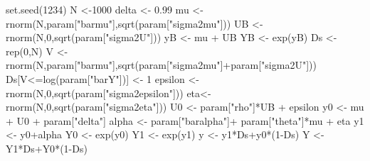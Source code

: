 \documentclass[
]{book}
\newenvironment{Shaded}{\begin{snugshade}}{\end{snugshade}}
\newcommand{\DecValTok}[1]{\textcolor[rgb]{0.00,0.00,0.81}{#1}}
\newcommand{\FloatTok}[1]{\textcolor[rgb]{0.00,0.00,0.81}{#1}}
\newcommand{\FunctionTok}[1]{\textcolor[rgb]{0.00,0.00,0.00}{#1}}
\newcommand{\NormalTok}[1]{#1}
\newcommand{\OtherTok}[1]{\textcolor[rgb]{0.56,0.35,0.01}{#1}}
\newcommand{\SpecialCharTok}[1]{\textcolor[rgb]{0.00,0.00,0.00}{#1}}
\newcommand{\StringTok}[1]{\textcolor[rgb]{0.31,0.60,0.02}{#1}}
\theoremstyle{definition}
\theoremstyle{definition}
\theoremstyle{definition}
\theoremstyle{definition}
\theoremstyle{remark}
\begin{document}
\begin{Shaded}
\begin{Highlighting}[]
\FunctionTok{set.seed}\NormalTok{(}\DecValTok{1234}\NormalTok{)}
\NormalTok{N }\OtherTok{\textless{}{-}}\DecValTok{1000}
\NormalTok{delta }\OtherTok{\textless{}{-}} \FloatTok{0.99}
\NormalTok{mu }\OtherTok{\textless{}{-}} \FunctionTok{rnorm}\NormalTok{(N,param[}\StringTok{"barmu"}\NormalTok{],}\FunctionTok{sqrt}\NormalTok{(param[}\StringTok{"sigma2mu"}\NormalTok{]))}
\NormalTok{UB }\OtherTok{\textless{}{-}} \FunctionTok{rnorm}\NormalTok{(N,}\DecValTok{0}\NormalTok{,}\FunctionTok{sqrt}\NormalTok{(param[}\StringTok{"sigma2U"}\NormalTok{]))}
\NormalTok{yB }\OtherTok{\textless{}{-}}\NormalTok{ mu }\SpecialCharTok{+}\NormalTok{ UB }
\NormalTok{YB }\OtherTok{\textless{}{-}} \FunctionTok{exp}\NormalTok{(yB)}
\NormalTok{Ds }\OtherTok{\textless{}{-}} \FunctionTok{rep}\NormalTok{(}\DecValTok{0}\NormalTok{,N)}
\NormalTok{V }\OtherTok{\textless{}{-}} \FunctionTok{rnorm}\NormalTok{(N,param[}\StringTok{"barmu"}\NormalTok{],}\FunctionTok{sqrt}\NormalTok{(param[}\StringTok{"sigma2mu"}\NormalTok{]}\SpecialCharTok{+}\NormalTok{param[}\StringTok{"sigma2U"}\NormalTok{]))}
\NormalTok{Ds[V}\SpecialCharTok{\textless{}=}\FunctionTok{log}\NormalTok{(param[}\StringTok{"barY"}\NormalTok{])] }\OtherTok{\textless{}{-}} \DecValTok{1} 
\NormalTok{epsilon }\OtherTok{\textless{}{-}} \FunctionTok{rnorm}\NormalTok{(N,}\DecValTok{0}\NormalTok{,}\FunctionTok{sqrt}\NormalTok{(param[}\StringTok{"sigma2epsilon"}\NormalTok{]))}
\NormalTok{eta}\OtherTok{\textless{}{-}} \FunctionTok{rnorm}\NormalTok{(N,}\DecValTok{0}\NormalTok{,}\FunctionTok{sqrt}\NormalTok{(param[}\StringTok{"sigma2eta"}\NormalTok{]))}
\NormalTok{U0 }\OtherTok{\textless{}{-}}\NormalTok{ param[}\StringTok{"rho"}\NormalTok{]}\SpecialCharTok{*}\NormalTok{UB }\SpecialCharTok{+}\NormalTok{ epsilon}
\NormalTok{y0 }\OtherTok{\textless{}{-}}\NormalTok{ mu }\SpecialCharTok{+}\NormalTok{  U0 }\SpecialCharTok{+}\NormalTok{ param[}\StringTok{"delta"}\NormalTok{]}
\NormalTok{alpha }\OtherTok{\textless{}{-}}\NormalTok{ param[}\StringTok{"baralpha"}\NormalTok{]}\SpecialCharTok{+}\NormalTok{  param[}\StringTok{"theta"}\NormalTok{]}\SpecialCharTok{*}\NormalTok{mu }\SpecialCharTok{+}\NormalTok{ eta}
\NormalTok{y1 }\OtherTok{\textless{}{-}}\NormalTok{ y0}\SpecialCharTok{+}\NormalTok{alpha}
\NormalTok{Y0 }\OtherTok{\textless{}{-}} \FunctionTok{exp}\NormalTok{(y0)}
\NormalTok{Y1 }\OtherTok{\textless{}{-}} \FunctionTok{exp}\NormalTok{(y1)}
\NormalTok{y }\OtherTok{\textless{}{-}}\NormalTok{ y1}\SpecialCharTok{*}\NormalTok{Ds}\SpecialCharTok{+}\NormalTok{y0}\SpecialCharTok{*}\NormalTok{(}\DecValTok{1}\SpecialCharTok{{-}}\NormalTok{Ds)}
\NormalTok{Y }\OtherTok{\textless{}{-}}\NormalTok{ Y1}\SpecialCharTok{*}\NormalTok{Ds}\SpecialCharTok{+}\NormalTok{Y0}\SpecialCharTok{*}\NormalTok{(}\DecValTok{1}\SpecialCharTok{{-}}\NormalTok{Ds)}
\end{Highlighting}
\end{Shaded}
\end{document}
